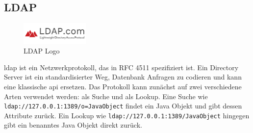 
\subsection{LDAP}\label{subsec:ldap}
\begin{figure}
    \begin{center}
        \includegraphics[width=0.3\textwidth]{images/ldap-logo}
    \end{center}
    \caption{LDAP Logo}
\end{figure}
\gls{ldap} ist ein Netzwerkprotokoll, das in RFC 4511 spezifiziert ist.
Ein  Directory Server ist ein standardisierter Weg, Datenbank Anfragen zu codieren und kann eine klassische \gls{api} ersetzen.
Das  Protokoll kann zunächst auf zwei verschiedene Arten verwendet werden: als Suche und als Lookup.
Eine Suche wie \verb|ldap://127.0.0.1:1389/o=JavaObject| findet ein Java Objekt und gibt dessen Attribute zurück.
Ein Lookup wie \verb|ldap://127.0.0.1:1389/JavaObject| hingegen gibt ein benanntes Java Objekt direkt zurück.
